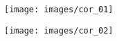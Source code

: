 \documentclass[10pt,fleqn]{article} %
\begin{document}
\newpage
%
\begin{center}
\texttt{[image: images/cor\_01]}
\end{center}
\begin{center}
\texttt{[image: images/cor\_02]}
\end{center}


\end{document}
